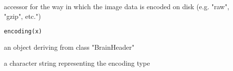 \begin{Description}\relax
accessor for the way in which the image data is encoded on disk
(e.g. "raw", "gzip", etc.")
\end{Description}
\begin{Usage}
\begin{verbatim}
encoding(x)
\end{verbatim}
\end{Usage}
\begin{Arguments}
\begin{ldescription}
\item[\code{x}] an object deriving from class "BrainHeader" 
\end{ldescription}
\end{Arguments}
\begin{Value}
a character string representing the encoding type
\end{Value}

